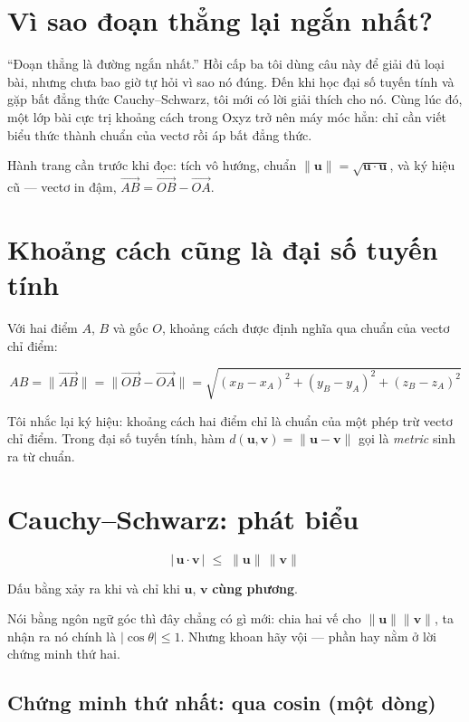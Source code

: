\documentclass[12pt,a4paper]{article}
\begin{document}
\section{Vì sao đoạn thẳng lại ngắn nhất?}

``Đoạn thẳng là đường ngắn nhất.'' Hồi cấp ba tôi dùng câu này để giải đủ loại bài, nhưng chưa bao giờ tự hỏi vì sao nó đúng. Đến khi học đại số tuyến tính và gặp bất đẳng thức Cauchy--Schwarz, tôi mới có lời giải thích cho nó. Cùng lúc đó, một lớp bài cực trị khoảng cách trong Oxyz trở nên máy móc hẳn: chỉ cần viết biểu thức thành chuẩn của vectơ rồi áp bất đẳng thức.

Hành trang cần trước khi đọc: tích vô hướng, chuẩn $\|\mathbf{u}\| = \sqrt{\mathbf{u}\cdot\mathbf{u}}$, và ký hiệu cũ --- vectơ in đậm, $\overrightarrow{AB} = \overrightarrow{OB}-\overrightarrow{OA}$.

\section{Khoảng cách cũng là đại số tuyến tính}

Với hai điểm $A$, $B$ và gốc $O$, khoảng cách được định nghĩa qua chuẩn của vectơ chỉ điểm:

$$
AB = \|\overrightarrow{AB}\| = \|\overrightarrow{OB}-\overrightarrow{OA}\|
= \sqrt{(x_B-x_A)^2+(y_B-y_A)^2+(z_B-z_A)^2}
$$

Tôi nhắc lại ký hiệu: khoảng cách hai điểm chỉ là chuẩn của một phép trừ vectơ chỉ điểm. Trong đại số tuyến tính, hàm $d(\mathbf{u},\mathbf{v}) = \|\mathbf{u}-\mathbf{v}\|$ gọi là \emph{metric} sinh ra từ chuẩn.

\section{Cauchy--Schwarz: phát biểu}

$$
\boxed{\;|\,\mathbf{u}\cdot\mathbf{v}\,| \;\le\; \|\mathbf{u}\|\,\|\mathbf{v}\|\;}
$$

Dấu bằng xảy ra khi và chỉ khi $\mathbf{u}$, $\mathbf{v}$ \textbf{cùng phương}.

Nói bằng ngôn ngữ góc thì đây chẳng có gì mới: chia hai vế cho $\|\mathbf{u}\|\|\mathbf{v}\|$, ta nhận ra nó chính là $|\cos\theta| \le 1$. Nhưng khoan hãy vội --- phần hay nằm ở lời chứng minh thứ hai.

\subsection*{Chứng minh thứ nhất: qua cosin (một dòng)}
\end{document}
